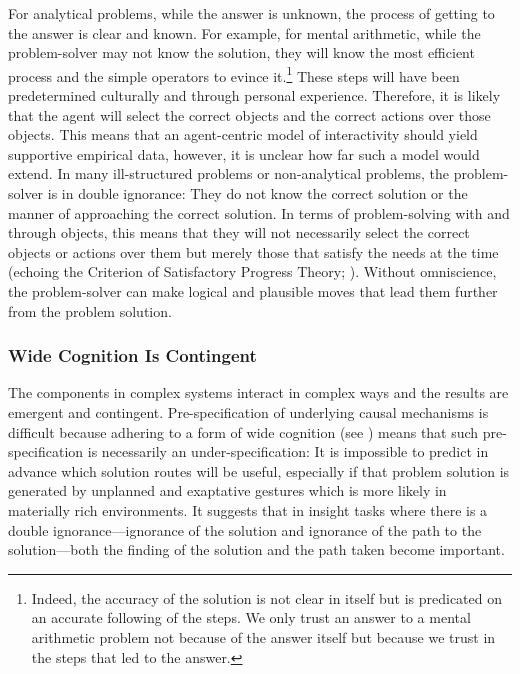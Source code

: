 \documentclass[twocolumn, serif, empirical, authordate]{jote-article}
\begin{document}
{{For analytical problems, while the answer is unknown, the process of getting to the answer is clear and known. For example, for mental arithmetic, while the problem-solver may not know the solution, they will know the most efficient process and the simple operators to evince it.\footnote{Indeed, the accuracy of the solution is not clear in itself but is predicated on an accurate following of the steps. We only trust an answer to a mental arithmetic problem not because of the answer itself but because we trust in the steps that led to the answer.} These steps will have been predetermined culturally and through personal experience. Therefore, it is likely that the agent will select the correct objects and the correct actions over those objects. This means that an agent-centric model of interactivity should yield supportive empirical data, however, it is unclear how far such a model would extend. In many ill-structured problems or non-analytical problems, the problem-solver is in double ignorance: They do not know the correct solution or the manner of approaching the correct solution. In terms of problem-solving with and through objects, this means that they will not necessarily select the correct objects or actions over them but merely those that satisfy the needs at the time (echoing the Criterion of Satisfactory Progress Theory; ). Without omniscience, the problem-solver can make logical and plausible moves that lead them further from the problem solution.


\subsubsection{Wide Cognition Is Contingent}

The components in complex systems interact in complex ways and the results are emergent and contingent. Pre-specification of underlying causal mechanisms is difficult because adhering to a form of wide cognition (see ) means that such pre-specification is necessarily an under-specification: It is impossible to predict in advance which solution routes will be useful, especially if that problem solution is generated by unplanned and exaptative gestures which is more likely in materially rich environments. It suggests that in insight tasks where there is a double ignorance---ignorance of the solution and ignorance of the path to the solution---both the finding of the solution and the path taken become important.

}}
\end{document}
